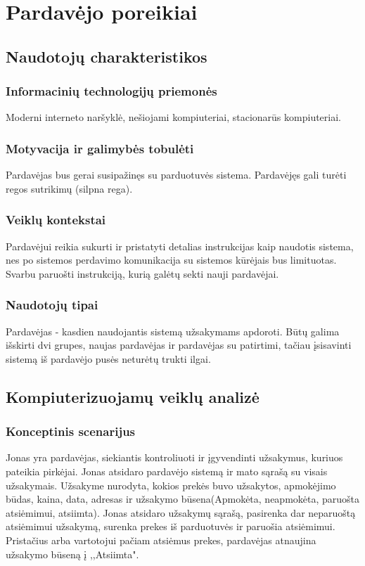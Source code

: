 \documentclass[oneside]{VUMIFPSkursinis}
\begin{document}
\section{Pardavėjo poreikiai}
	\subsection{Naudotojų charakteristikos}
		\subsubsection{Informacinių technologijų priemonės}
			Moderni interneto naršyklė, nešiojami kompiuteriai, stacionarūs kompiuteriai.
		\subsubsection{Motyvacija ir galimybės tobulėti}
			Pardavėjas bus gerai susipažinęs su parduotuvės sistema. Pardavėjęs gali turėti regos sutrikimų (silpna rega).
		\subsubsection{Veiklų kontekstai}
			Pardavėjui reikia sukurti ir pristatyti detalias instrukcijas kaip naudotis sistema, nes po sistemos perdavimo komunikacija su sistemos kūrėjais bus limituotas. Svarbu paruošti instrukciją, kurią galėtų sekti nauji pardavėjai.
		\subsubsection{Naudotojų tipai}
			Pardavėjas - kasdien naudojantis sistemą užsakymams apdoroti. Būtų galima išskirti dvi grupes, naujas pardavėjas ir pardavėjas su patirtimi, tačiau įsisavinti sistemą iš pardavėjo pusės neturėtų trukti ilgai.
	\subsection{Kompiuterizuojamų veiklų analizė}
		\subsubsection{Konceptinis scenarijus}
			Jonas yra pardavėjas, siekiantis kontroliuoti ir įgyvendinti užsakymus, kuriuos pateikia pirkėjai. Jonas atsidaro pardavėjo sistemą ir mato sąrašą su visais užsakymais. Užsakyme nurodyta, kokios prekės buvo užsakytos, apmokėjimo būdas, kaina, data, adresas ir užsakymo būsena(Apmokėta, neapmokėta, paruošta atsiėmimui, atsiimta). Jonas atsidaro užsakymų sąrašą, pasirenka dar neparuoštą atsiėmimui užsakymą, surenka prekes iš parduotuvės ir paruošia atsiėmimui. Pristačius arba vartotojui pačiam atsiėmus prekes, pardavėjas atnaujina užsakymo būseną į ,,Atsiimta".
\end{document}
